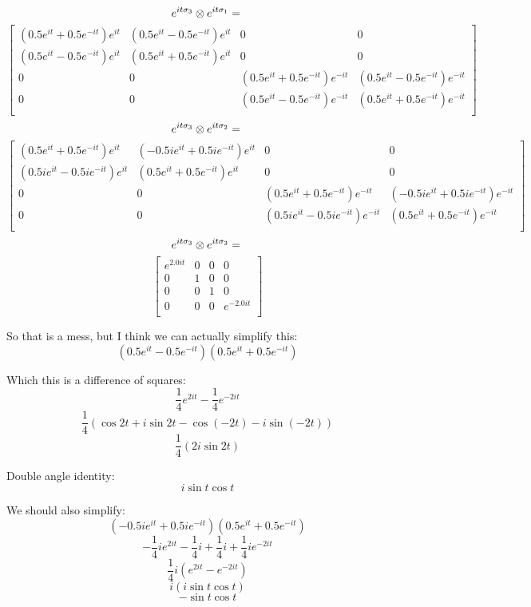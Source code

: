 \documentclass{article}
\begin{document}
\[ e^{it\sigma_3} \otimes e^{it\sigma_1} = \\ \] \[  \left[
    \begin{array}{cccc}
    ({0.5e^{it} + 0.5e^{-it}})e^{it} & ({0.5e^{it} - 0.5e^{-it}})e^{it} & 0 & 0 \\
    ({0.5e^{it} - 0.5e^{-it}})e^{it} & ({0.5e^{it} + 0.5e^{-it}})e^{it} & 0 & 0 \\
    0 & 0 & ({0.5e^{it} + 0.5e^{-it}})e^{-it} & ({0.5e^{it} - 0.5e^{-it}})e^{-it} \\
    0 & 0 & ({0.5e^{it} - 0.5e^{-it}})e^{-it} & ({0.5e^{it} + 0.5e^{-it}})e^{-it} \\
    \end{array}
    \right]  \]
\[ e^{it\sigma_3} \otimes e^{it\sigma_2} = \\ \] \[ \left[
    \begin{array}{cccc}
    ({0.5e^{it} + 0.5e^{-it}})e^{it} & ({-0.5ie^{it} + 0.5ie^{-it}})e^{it} & 0 & 0 \\
    ({0.5ie^{it} - 0.5ie^{-it}})e^{it} & ({0.5e^{it} + 0.5e^{-it}})e^{it} & 0 & 0 \\
    0 & 0 & ({0.5e^{it} + 0.5e^{-it}})e^{-it} & ({-0.5ie^{it} + 0.5ie^{-it}})e^{-it} \\
    0 & 0 & ({0.5ie^{it} - 0.5ie^{-it}})e^{-it} & ({0.5e^{it} + 0.5e^{-it}})e^{-it} \\
    \end{array}
    \right]   \]
\[ e^{it\sigma_3} \otimes e^{it\sigma_3} = \\ \] \[ \left[
    \begin{array}{cccc}
    e^{2.0it} & 0 & 0 & 0 \\
    0 & 1 & 0 & 0 \\
    0 & 0 & 1 & 0 \\
    0 & 0 & 0 & e^{-2.0it} \\
    \end{array}
    \right] \]

So that is a mess, but I think we can actually simplify this: 
\[ ({0.5e^{it} - 0.5e^{-it}})({0.5e^{it} + 0.5e^{-it}}) \]

Which this is a difference of squares:
\[ \frac{1}{4}e^{2it} - \frac{1}{4}e^{-2it} \] 
\[ \frac{1}{4}\left( \cos{2t} + i\sin{2t} - \cos{(-2t)} - i\sin{(-2t)} \right) \]
\[ \frac{1}{4}\left( 2i\sin{2t} \right) \]

Double angle identity: 
\[ i\sin{t}\cos{t} \]

We should also simplify:
\[ ({-0.5ie^{it} + 0.5ie^{-it}})({0.5e^{it} + 0.5e^{-it}}) \]
\[ -\frac{1}{4}ie^{2it} - \frac{1}{4}i + \frac{1}{4}i + \frac{1}{4}ie^{-2it} \]
\[ \frac{1}{4}i\left( e^{2it} - e^{-2it} \right) \]
\[ i \left(i\sin{t}\cos{t}\right) \]
\[ -\sin{t}\cos{t} \]
\end{document}
